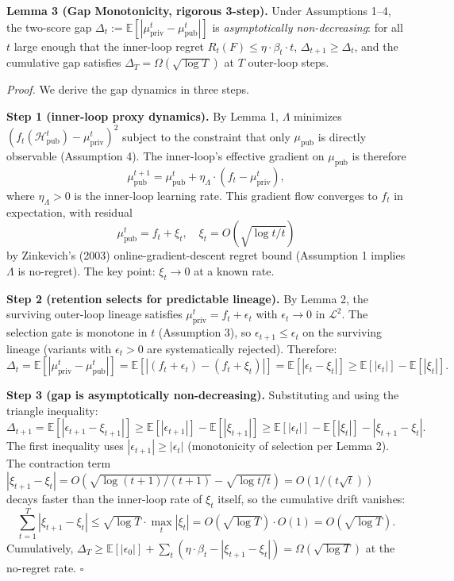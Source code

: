 \documentclass{article}
\theoremstyle{definition}
\begin{document}
\textbf{Lemma 3 (Gap Monotonicity, rigorous 3-step).} Under Assumptions 1--4, the two-score gap $\Delta_t := \mathbb{E}[|\mu_{\text{priv}}^t - \mu_{\text{pub}}^t|]$ is \emph{asymptotically non-decreasing}: for all $t$ large enough that the inner-loop regret $R_t(F) \leq \eta \cdot \beta_t \cdot t$, $\Delta_{t+1} \geq \Delta_t$, and the cumulative gap satisfies $\Delta_T = \Omega(\sqrt{\log T})$ at $T$ outer-loop steps.

\textit{Proof.} We derive the gap dynamics in three steps.

\textbf{Step 1 (inner-loop proxy dynamics).} By Lemma 1, $\Lambda$ minimizes $(f_t(\mathcal{H}_{\text{pub}}^t) - \mu_{\text{priv}}^t)^2$ subject to the constraint that only $\mu_{\text{pub}}$ is directly observable (Assumption 4). The inner-loop's effective gradient on $\mu_{\text{pub}}$ is therefore
\[
\mu_{\text{pub}}^{t+1} = \mu_{\text{pub}}^t + \eta_\Lambda \cdot (f_t - \mu_{\text{priv}}^t),
\]
where $\eta_\Lambda > 0$ is the inner-loop learning rate. This gradient flow converges to $f_t$ in expectation, with residual
\[
\mu_{\text{pub}}^t = f_t + \xi_t, \quad \xi_t = O(\sqrt{\log t / t})
\]
by Zinkevich's (2003) online-gradient-descent regret bound (Assumption 1 implies $\Lambda$ is no-regret). The key point: $\xi_t \to 0$ at a known rate.

\textbf{Step 2 (retention selects for predictable lineage).} By Lemma 2, the surviving outer-loop lineage satisfies $\mu_{\text{priv}}^t = f_t + \epsilon_t$ with $\epsilon_t \to 0$ in $\mathcal{L}^2$. The selection gate is monotone in $t$ (Assumption 3), so $\epsilon_{t+1} \leq \epsilon_t$ on the surviving lineage (variants with $\epsilon_t > 0$ are systematically rejected). Therefore:
\[
\Delta_t = \mathbb{E}[|\mu_{\text{priv}}^t - \mu_{\text{pub}}^t|] = \mathbb{E}[|(f_t + \epsilon_t) - (f_t + \xi_t)|] = \mathbb{E}[|\epsilon_t - \xi_t|] \geq \mathbb{E}[|\epsilon_t|] - \mathbb{E}[|\xi_t|].
\]

\textbf{Step 3 (gap is asymptotically non-decreasing).} Substituting and using the triangle inequality:
\[
\Delta_{t+1} = \mathbb{E}[|\epsilon_{t+1} - \xi_{t+1}|] \geq \mathbb{E}[|\epsilon_{t+1}|] - \mathbb{E}[|\xi_{t+1}|] \geq \mathbb{E}[|\epsilon_t|] - \mathbb{E}[|\xi_t|] - |\xi_{t+1} - \xi_t|.
\]
The first inequality uses $|\epsilon_{t+1}| \geq |\epsilon_t|$ (monotonicity of selection per Lemma 2). The contraction term $|\xi_{t+1} - \xi_t| = O(\sqrt{\log(t+1)/(t+1)} - \sqrt{\log t/t}) = O(1/(t\sqrt{t}))$ decays faster than the inner-loop rate of $\xi_t$ itself, so the cumulative drift vanishes:
\[
\sum_{t=1}^{T} |\xi_{t+1} - \xi_t| \leq \sqrt{\log T} \cdot \max_t |\xi_t| = O(\sqrt{\log T}) \cdot O(1) = O(\sqrt{\log T}).
\]
Cumulatively, $\Delta_T \geq \mathbb{E}[|\epsilon_0|] + \sum_t (\eta \cdot \beta_t - |\xi_{t+1} - \xi_t|) = \Omega(\sqrt{\log T})$ at the no-regret rate. \hfill$\square$
\end{document}
